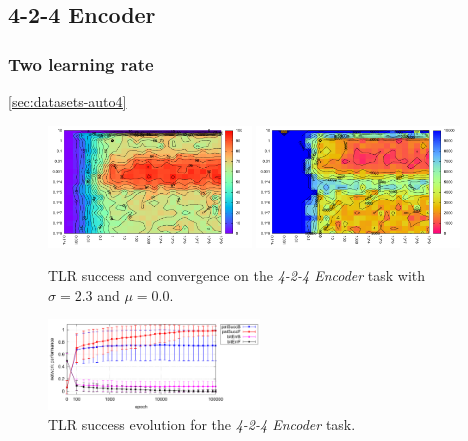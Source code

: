 \subsection{4-2-4 Encoder} 

\subsubsection{Two learning rate} 
\label{sec:tlr-auto4} 
\ref{sec:datasets-auto4} 
\begin{figure}[H]
  \centering
  \includegraphics[width=0.48\textwidth]{img/tlr-auto4-success.pdf}   
  \includegraphics[width=0.48\textwidth]{img/tlr-auto4-epoch.pdf}     
  \caption{TLR success and convergence on the \emph{4-2-4 Encoder} task with $\sigma = 2.3$ and $\mu = 0.0$.}
  \label{fig:results-tlr-auto4-performance}
\end{figure}

\begin{figure}[H]
  \centering
  \includegraphics[width=0.5\textwidth]{img/tlr-best-perf.pdf}      
  \caption{TLR success evolution for the \emph{4-2-4 Encoder} task.}
  \label{fig:results-tlr-auto4-epoch} 
\end{figure}


